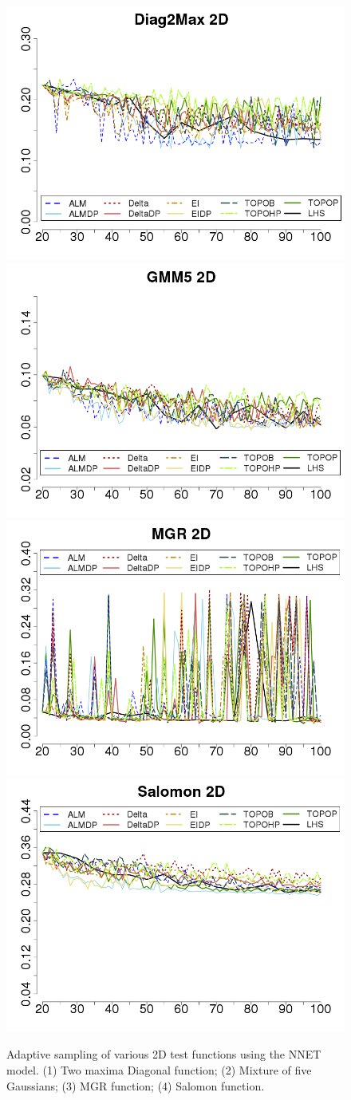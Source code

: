 \begin{figure}[htbp]
\begin{center}
  \includegraphics[width=0.48\linewidth]{figs/chap5/nnet_Diag2Max_td=20}\label{fig:2diag2D_nnet}
  \includegraphics[width=0.48\linewidth]{figs/chap5/nnet_GMM5_2D_td=20}\label{fig:gmm52D_nnet}
  \includegraphics[width=0.48\linewidth]{figs/chap5/nnet_MGR_td=20}\label{fig:mgr2D_nnet}
  \includegraphics[width=0.48\linewidth]{figs/chap5/nnet_Salomon_td=20}\label{fig:salomon2D_nnet}
\caption{Adaptive sampling of various 2D test functions using the NNET model.
(1) Two maxima Diagonal function;
(2) Mixture of five Gaussians;
(3) MGR function;
(4) Salomon function.}
\label{fig:nnet_2D}
\end{center}
\end{figure}

